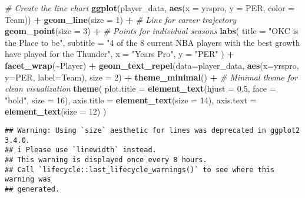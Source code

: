 \documentclass[
]{article}
\newenvironment{Shaded}{\begin{snugshade}}{\end{snugshade}}
\newcommand{\AttributeTok}[1]{\textcolor[rgb]{0.13,0.29,0.53}{#1}}
\newcommand{\CommentTok}[1]{\textcolor[rgb]{0.56,0.35,0.01}{\textit{#1}}}
\newcommand{\DecValTok}[1]{\textcolor[rgb]{0.00,0.00,0.81}{#1}}
\newcommand{\FloatTok}[1]{\textcolor[rgb]{0.00,0.00,0.81}{#1}}
\newcommand{\FunctionTok}[1]{\textcolor[rgb]{0.13,0.29,0.53}{\textbf{#1}}}
\newcommand{\NormalTok}[1]{#1}
\newcommand{\SpecialCharTok}[1]{\textcolor[rgb]{0.81,0.36,0.00}{\textbf{#1}}}
\newcommand{\StringTok}[1]{\textcolor[rgb]{0.31,0.60,0.02}{#1}}
\begin{document}
\begin{Shaded}
\begin{Highlighting}[]
\CommentTok{\# Create the line chart}
\FunctionTok{ggplot}\NormalTok{(player\_data, }\FunctionTok{aes}\NormalTok{(}\AttributeTok{x =}\NormalTok{ yrspro, }\AttributeTok{y =}\NormalTok{ PER, }\AttributeTok{color =}\NormalTok{ Team)) }\SpecialCharTok{+}
  \FunctionTok{geom\_line}\NormalTok{(}\AttributeTok{size =} \DecValTok{1}\NormalTok{) }\SpecialCharTok{+}  \CommentTok{\# Line for career trajectory}
  \FunctionTok{geom\_point}\NormalTok{(}\AttributeTok{size =} \DecValTok{3}\NormalTok{) }\SpecialCharTok{+}  \CommentTok{\# Points for individual seasons}
  \FunctionTok{labs}\NormalTok{(}
    \AttributeTok{title =} \StringTok{"OKC is the Place to be"}\NormalTok{,}
    \AttributeTok{subtitle =} \StringTok{"4 of the 8 current NBA players with the best growth have played for the Thunder"}\NormalTok{,}
    \AttributeTok{x =} \StringTok{"Years Pro"}\NormalTok{,}
    \AttributeTok{y =} \StringTok{"PER"}
\NormalTok{  ) }\SpecialCharTok{+}
  \FunctionTok{facet\_wrap}\NormalTok{(}\SpecialCharTok{\textasciitilde{}}\NormalTok{Player) }\SpecialCharTok{+}
  \FunctionTok{geom\_text\_repel}\NormalTok{(}\AttributeTok{data=}\NormalTok{player\_data, }\FunctionTok{aes}\NormalTok{(}\AttributeTok{x=}\NormalTok{yrspro, }\AttributeTok{y=}\NormalTok{PER, }\AttributeTok{label=}\NormalTok{Team), }\AttributeTok{size =} \DecValTok{2}\NormalTok{) }\SpecialCharTok{+}
  \FunctionTok{theme\_minimal}\NormalTok{() }\SpecialCharTok{+}  \CommentTok{\# Minimal theme for clean visualization}
  \FunctionTok{theme}\NormalTok{(}
    \AttributeTok{plot.title =} \FunctionTok{element\_text}\NormalTok{(}\AttributeTok{hjust =} \FloatTok{0.5}\NormalTok{, }\AttributeTok{face =} \StringTok{"bold"}\NormalTok{, }\AttributeTok{size =} \DecValTok{16}\NormalTok{),}
    \AttributeTok{axis.title =} \FunctionTok{element\_text}\NormalTok{(}\AttributeTok{size =} \DecValTok{14}\NormalTok{),}
    \AttributeTok{axis.text =} \FunctionTok{element\_text}\NormalTok{(}\AttributeTok{size =} \DecValTok{12}\NormalTok{)}
\NormalTok{  )}
\end{Highlighting}
\end{Shaded}

\begin{verbatim}
## Warning: Using `size` aesthetic for lines was deprecated in ggplot2 3.4.0.
## i Please use `linewidth` instead.
## This warning is displayed once every 8 hours.
## Call `lifecycle::last_lifecycle_warnings()` to see where this warning was
## generated.
\end{verbatim}
\end{document}
